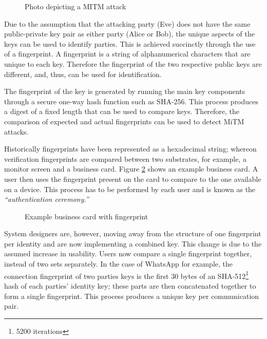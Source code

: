 \begin{center}
    
    \begin{figure}[h]
        \caption{Photo depicting a MITM attack}
        \label{fig:mitm}
    \end{figure}
\end{center}

Due to the assumption that the attacking party (Eve) does not have the same public-private key pair as either party (Alice or Bob), the unique aspects of the keys can be used to identify parties. This is achieved succinctly through the use of a fingerprint. A fingerprint is a string of alphanumerical characters that are unique to each key. Therefore the fingerprint of the two respective public keys are different, and, thus, can be used for identification.

The fingerprint of the key is generated by running the main key components through a secure one-way hash function such as SHA-256. This process produces a digest of a fixed length that can be used to compare keys. Therefore, the comparison of expected and actual fingerprints can be used to detect MiTM attacks.

Historically fingerprints have been represented as a hexadecimal string; whereon verification fingerprints are compared between two substrates, for example, a monitor screen and a business card. Figure \ref{fig:businessCard} shows an example business card. A user then uses the fingerprint present on the card to compare to the one available on a device. This process has to be performed by each user and is known as the \textit{``authentication ceremony.''} 

\begin{figure}[h!]
    \centering
    \fbox{
        
    }
    \caption{Example business card with fingerprint}
    \label{fig:businessCard}
\end{figure}

System designers are, however, moving away from the structure of one fingerprint per identity and are now implementing a combined key. This change is due to the assumed increase in usability. Users now compare a single fingerprint together, instead of two sets separately. In the case of WhatsApp for example, the connection fingerprint of two parties keys is the first 30 bytes of an SHA-512\footnote{5200 iterations} hash of each parties' identity key; these parts are then concatenated together to form a single fingerprint\cite{whatsapp2017paper}. This process produces a unique key per communication pair.

